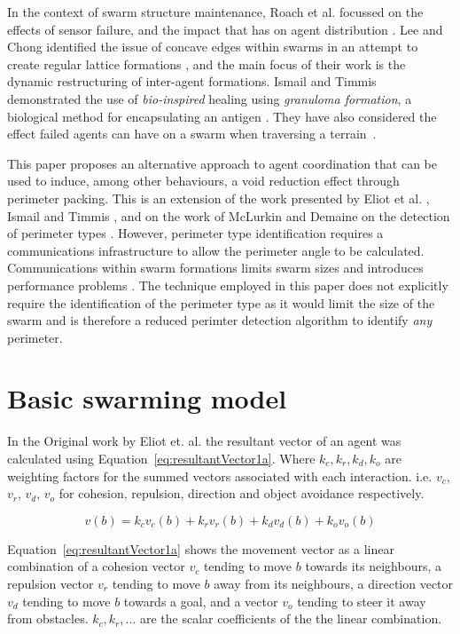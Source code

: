 \documentclass[12pt,a4paper]{IEEEtran}
\newcommand{\kc}{\mathit{k_{c}}}
\newcommand{\kr}{\mathit{k_{r}}}
\newcommand{\kd}{\mathit{k_{d}}}
\newcommand{\ko}{\mathit{k_{o}}}
\begin{document}
In the context of swarm structure maintenance, Roach et al. focussed on the effects of sensor failure, and the impact that has on agent distribution \cite{RMT:15}. Lee and Chong identified the issue of concave edges within swarms in an attempt to create regular lattice formations \cite{GN:08}, and the main focus of their work is the dynamic restructuring of inter-agent formations. Ismail and Timmis demonstrated the use of \textit{bio-inspired} healing using \textit{granuloma formation}, a biological method for encapsulating an antigen \cite{IT:10}. They have also considered the effect failed agents can have on a swarm when traversing a terrain~\cite{TIBW:16}. 

This paper proposes an alternative approach to agent coordination that can be used to induce, among other behaviours, a void reduction effect through perimeter packing. This is an extension of the work presented by Eliot et al. \cite{eliot2019void}, Ismail and Timmis \cite{IT:10,TIBW:16}, and on the work of McLurkin and Demaine on the detection of perimeter types \cite{mclurkin2009}. However, perimeter type identification requires a communications infrastructure to allow the perimeter angle to be calculated. Communications within swarm formations limits swarm sizes and introduces performance problems \cite{fu2020formation}. The technique employed in this paper does not explicitly require the identification of the perimeter type as it would limit the size of the swarm\cite{eliot2019void,GN:08} and is therefore a reduced perimter detection algorithm to identify \textit{any} perimeter.

\section{Basic swarming model}\label{sec:basicModel}
In the Original work by Eliot et. al. the resultant vector of an agent was calculated using Equation~\ref{eq:resultantVector1a}. Where $\kc, \kr, k_d, k_o$ are weighting factors for the summed vectors associated with each interaction. i.e. $v_c$, $v_r$, $v_d$, $v_o$ for cohesion, repulsion, direction and object avoidance respectively. 

\begin{equation}\label{eq:resultantVector1a}
	v(b) = \kc v_c(b) + \kr v_r(b) + \kd v_d(b) + \ko v_o(b)
\end{equation}

Equation~\ref{eq:resultantVector1a} shows the movement vector as a linear combination of a cohesion vector $v_c$ tending to move $b$ towards its neighbours, a repulsion vector $v_r$ tending to move $b$ away from its neighbours, a direction vector  $v_d$ tending to move $b$ towards a goal, and a vector $v_o$ tending to steer it away from obstacles. $\kc, \kr, ...$ are the scalar coefficients of the the linear combination.
\end{document}

